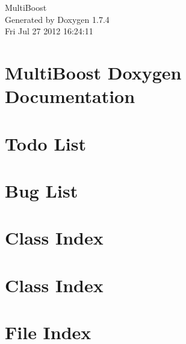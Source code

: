 \documentclass[a4paper]{book}
\begin{document}
\hypersetup{pageanchor=false}
\begin{titlepage}
\vspace*{7cm}
\begin{center}
{\Large MultiBoost }\\
\vspace*{1cm}
{\large Generated by Doxygen 1.7.4}\\
\vspace*{0.5cm}
{\small Fri Jul 27 2012 16:24:11}\\
\end{center}
\end{titlepage}
\clearemptydoublepage
{}
\tableofcontents
\clearemptydoublepage
{}
\hypersetup{pageanchor=true}
\chapter{MultiBoost Doxygen Documentation}
\label{index}\hypertarget{index}{}
\chapter{Todo List}
\label{todo}
\hypertarget{todo}{}

\chapter{Bug List}
\label{bug}
\hypertarget{bug}{}

\chapter{Class Index}

\chapter{Class Index}

\chapter{File Index}

\end{document}
